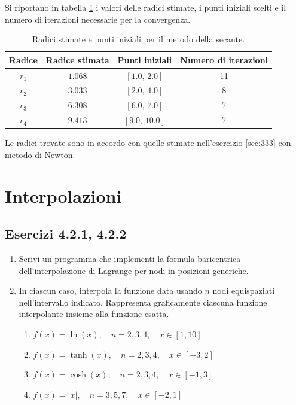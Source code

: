 \documentclass[letterpaper, 12pt]{article}
\numberwithin{equation}{section}    %
\begin{document}
Si riportano in tabella \ref{tab:es3_4_3_1} i valori delle radici stimate, i punti iniziali scelti e il numero di iterazioni
necessarie per la convergenza.
\begin{table}[!ht]
    \centering
    \begin{tabular}{|c|c|c|c|}
        \hline
        \textbf{Radice} & \textbf{Radice stimata} & \textbf{Punti iniziali} & \textbf{Numero di iterazioni} \\
        \hline
        $r_1$ & $1.068$  & $[1.0,\,2.0]$   & 11  \\
        $r_2$ & $3.033$  & $[2.0,\,4.0]$   & 8  \\
        $r_3$ & $6.308$  & $[6.0,\,7.0]$   & 7  \\
        $r_4$ & $9.413$  & $[9.0,\,10.0]$  & 7  \\
        \hline
    \end{tabular}
    \caption{Radici stimate e punti iniziali per il metodo della secante.}
    \label{tab:es3_4_3_1}
\end{table}
Le radici trovate sono in accordo con quelle stimate nell'esercizio \ref{sec:333} 
con metodo di Newton.

\section{Interpolazioni}

\subsection{Esercizi 4.2.1, 4.2.2}
\begin{enumerate}
    \item Scrivi un programma che implementi la formula baricentrica dell'interpolazione di Lagrange per nodi in posizioni generiche.
    \item In ciascun caso, interpola la funzione data usando $n$ nodi equispaziati nell'intervallo indicato. Rappresenta graficamente ciascuna funzione interpolante insieme alla funzione esatta.
    \begin{enumerate}
        \item $f(x) = \ln (x), \quad n = 2,3,4, \quad x\in [1,10]$
        \item $f(x) = \tanh (x), \quad n = 2,3,4, \quad x \in [-3,2]$
        \item $f(x) = \cosh (x), \quad n = 2,3,4, \quad x \in [-1,3]$
        \item $f(x) = |x|, \quad n = 3,5,7, \quad x \in [-2,1]$
    \end{enumerate}
\end{enumerate}
\end{document}
